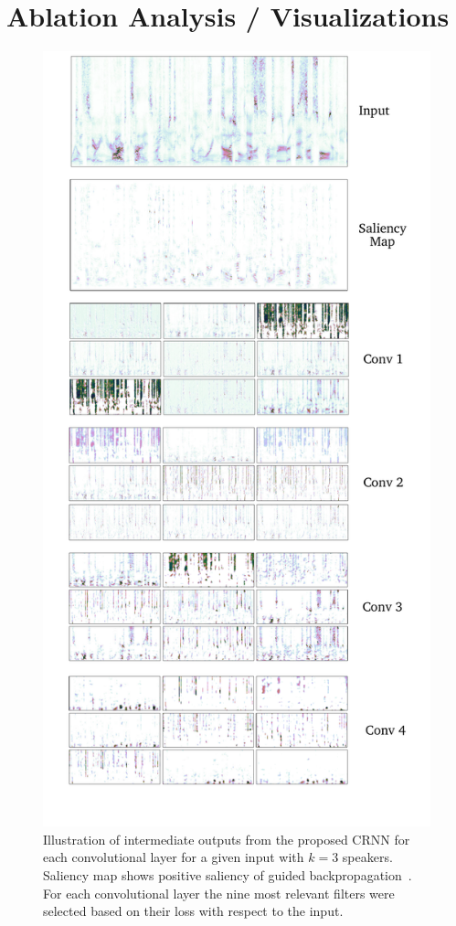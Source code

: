 \section{Ablation Analysis / Visualizations}%
\label{sec:ablation}
\begin{figure}[t]
  \includegraphics[width=\columnwidth, height=0.7\paperheight, keepaspectratio]{Chapters/dsc/figures/outputs.pdf}
  \caption{Illustration of intermediate outputs from the proposed CRNN for each convolutional layer for a given input with \(k=3\) speakers. Saliency map shows positive saliency of guided backpropagation~\cite{Springenberg14}. For each convolutional layer the nine most relevant filters were selected based on their loss with respect to the input.}%
\label{fig:convoutputs}
\end{figure}

